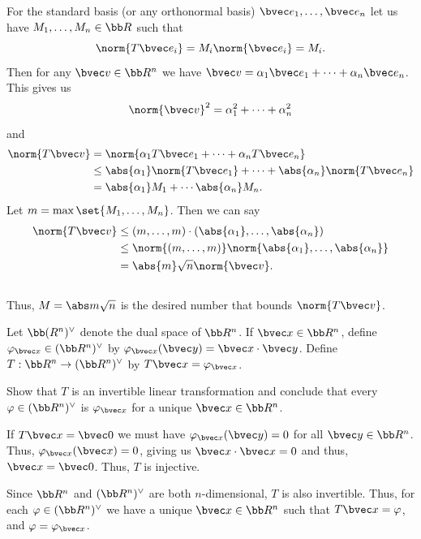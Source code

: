 \documentclass[12pt, letterpaper]{hmcpset}
\begin{document}
\begin{solution}
	For the standard basis (or any orthonormal basis) $\bvec e_1, \ldots, \bvec e_n$ let us have $M_1, \ldots, M_n \in \bb R$ such that
	\[
		\norm{T \bvec e_i} = M_i \norm{\bvec e_i} = M_i.
	\]
	Then for any $\bvec v \in \bb R^n$ we have $\bvec v = \alpha_1 \bvec e_1 + \cdots + \alpha_n \bvec e_n$. This gives us
	\[
		\norm{\bvec v}^2 = \alpha_1^2 + \cdots + \alpha_n^2
	\]
	and
	\[
		\begin{split}
			\norm{T \bvec v} & = \norm{\alpha_1 T \bvec e_1 + \cdots + \alpha_n T \bvec e_n} \\
					   & \le \abs{\alpha_1} \norm{T \bvec e_1} + \cdots + \abs{\alpha_n} \norm{T \bvec e_n} \\
					   & = \abs{\alpha_1} M_1 + \cdots \abs{\alpha_n} M_n.
		\end{split}
	\]
	Let $m = \max \set{M_1, \ldots, M_n}$. Then we can say
	\[
		\begin{split}
			\norm{T \bvec v} & \le (m, \ldots, m) \cdot (\abs{\alpha_1}, \ldots, \abs{\alpha_n}) \\
					 & \le \norm{(m, \ldots, m)} \norm{\abs{\alpha_1}, \ldots, \abs{\alpha_n}} \\
					 & = \abs{m} \sqrt{n} \norm{\bvec v}.
		\end{split}
	\] \\
	Thus, $M = \abs m \sqrt n$ is the desired number that bounds $\norm{T \bvec v}$.
\end{solution}

\pagebreak

\begin{problem}[12]
	Let $\bb (R^n)^\vee$ denote the dual space of $\bb R^n$. If $\bvec x \in \bb R^n$, define $\varphi_{\bvec x} \in (\bb R^n)^\vee$ by $\varphi_{\bvec x}(\bvec y) = \bvec x \cdot \bvec y$. Define $T : \bb R^n \to (\bb R^n)^\vee$ by $T \bvec x = \varphi_{\bvec x}$. 

	Show that $T$ is an invertible linear transformation and conclude that every $\varphi \in (\bb R^n)^\vee$ is $\varphi_{\bvec x}$ for a unique $\bvec x \in \bb R^n$.
\end{problem}

\begin{solution}
	If $T \bvec x = \bvec 0$ we must have $\varphi_{\bvec x} (\bvec y) = 0$ for all $\bvec y \in \bb R^n$. Thus, $\varphi_{\bvec x}(\bvec x) = 0$, giving us $\bvec x \cdot \bvec x = 0$ and thus, $\bvec x = \bvec 0$. Thus, $T$ is injective. 

	Since $\bb R^n$ and $(\bb R^n)^\vee$ are both $n$-dimensional, $T$ is also invertible. Thus, for each $\varphi \in (\bb R^n)^\vee$ we have a unique $\bvec x \in \bb R^n$ such that $T \bvec x = \varphi$, and $\varphi = \varphi_{\bvec x}$.
\end{solution}
\end{document}
